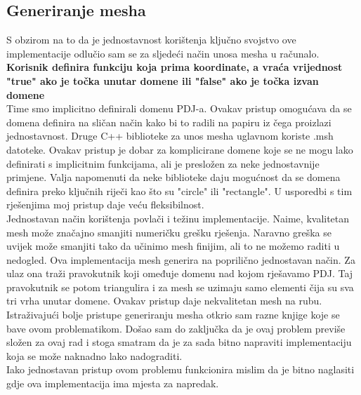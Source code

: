\documentclass[zavrsnirad]{../fer}
\begin{document}
\subsection{Generiranje mesha}

S obzirom na to da
je jednostavnost korištenja ključno svojstvo ove implementacije 
odlučio sam se za sljedeći način unosa mesha u računalo.
\bigskip
\\ 
\textbf{Korisnik definira funkciju koja prima koordinate, a
vraća vrijednost "true" ako je točka unutar domene ili
"false" ako je točka izvan domene}
\bigskip
\\ 
Time smo implicitno definirali domenu PDJ-a.
Ovakav pristup omogućava da se domena definira na sličan 
način kako bi to radili na papiru iz čega proizlazi jednostavnost.
Druge C++ biblioteke za unos mesha uglavnom koriste .msh datoteke.
Ovakav pristup je dobar za komplicirane domene koje se ne mogu
lako definirati s implicitnim funkcijama, ali je presložen za neke
jednostavnije primjene. Valja napomenuti da neke biblioteke 
daju mogućnost da se domena definira preko ključnih riječi kao 
što su "circle" ili "rectangle". U usporedbi s tim rješenjima 
moj pristup daje veću fleksibilnost.
\bigskip
\\ 
Jednostavan način korištenja povlači i težinu implementacije.
Naime, kvalitetan mesh može značajno smanjiti numeričku grešku
rješenja. Naravno greška se uvijek može smanjiti tako da 
učinimo mesh finijim, ali to ne možemo raditi u nedogled.
Ova implementacija mesh generira na poprilično jednostavan način.
Za ulaz ona traži pravokutnik koji omeđuje domenu nad kojom
rješavamo PDJ. Taj pravokutnik se potom triangulira i za mesh
se uzimaju samo elementi čija su sva tri vrha unutar domene.
Ovakav pristup daje nekvalitetan mesh na rubu. Istraživajući
bolje pristupe generiranju mesha otkrio sam razne knjige koje
se bave ovom problematikom. Došao sam do zaključka da 
je ovaj problem previše složen za ovaj rad i stoga smatram da
je za sada bitno napraviti implementaciju koja se može naknadno lako 
nadograditi.
\\
Iako jednostavan pristup ovom problemu funkcionira
mislim da je bitno naglasiti gdje ova implementacija ima
mjesta za napredak.
\end{document}
